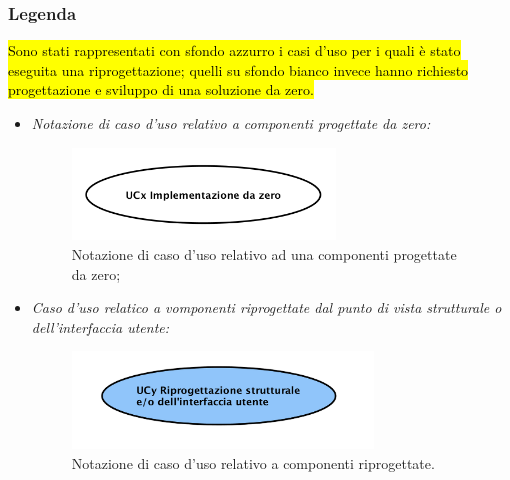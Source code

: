 	\subsubsection{Legenda}
	\hl{Sono stati rappresentati con sfondo azzurro i casi d'uso per i quali è stato eseguita una riprogettazione; quelli su sfondo bianco  invece hanno richiesto progettazione e sviluppo di una soluzione da zero.}
	\begin{itemize}
		\item \textit{Notazione di caso d'uso relativo a  componenti progettate da zero:}
		\begin{figure}[H]
			\begin{center}
				\includegraphics[width=7cm]{Pics/UCDaZero.png}
				\caption{Notazione di caso d'uso  relativo ad una componenti progettate da zero;}
				\label{fig:DiagrammaUCDaZero}
			\end{center}
		\end{figure}
		\item \textit{Caso d'uso relatico a vomponenti riprogettate dal punto di vista strutturale o dell'interfaccia utente:}
				 	\begin{figure}[H]
				 		\begin{center}
				 			\includegraphics[width=8cm]{Pics/UCRestaurato.png}
				 			\caption{Notazione di caso d'uso relativo a componenti riprogettate.}
				 			\label{fig:DiagrammaUCRiprogettato}
				 		\end{center}
				 	\end{figure}		
	\end{itemize}
	\newpage
